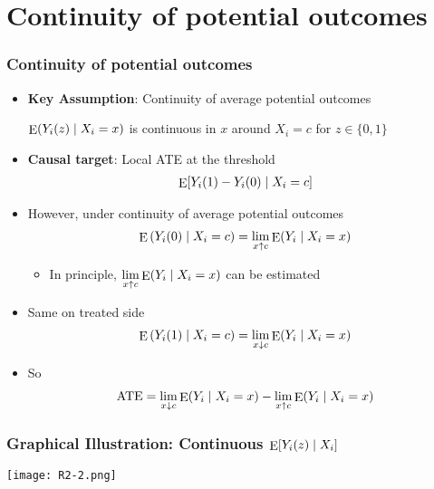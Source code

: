 \documentclass[table, xcolor = {dvipsnames}, 9pt]{beamer}
\theoremstyle{plain}
\DeclareMathOperator{\E}{\rm{E}}
\begin{document}
\section{Continuity of potential outcomes}
\begin{frame}
\frametitle{Continuity of potential outcomes} 
\begin{itemize} \vfill
\item {\bf Key Assumption}: \alert{Continuity of average potential outcomes} \vfill
\begin{center} \vfill
$\E(Y_i(z)\mid X_i=x)$ is continuous in $x$ around $X_i = c$
for $z \in \{0, 1\}$
\end{center} \vfill
\item {\bf Causal target}: Local ATE at the threshold \vfill
\begin{align*}
\E[Y_i(1) - Y_i(0) \mid X_i = c]
\end{align*} \vfill
\item However, under continuity of average potential outcomes \vfill
\begin{align*}
\E\left(Y_i(0) \mid X_i = c\right) = \lim_{x\uparrow c}\E(Y_i \mid X_i = x)
\end{align*} \vfill
\begin{itemize} \vfill
\item In principle, $\lim \limits_{x\uparrow c}\E(Y_i \mid X_i = x)$ can be estimated \vfill
\end{itemize} \vfill
\item Same on treated side
\begin{align*}
\E\left(Y_i(1) \mid X_i = c\right) = \lim_{x\downarrow c}\E(Y_i \mid X_i = x)
\end{align*} \vfill
\item So \vfill
\begin{align*}
\textrm{ATE} = \lim_{x\downarrow c}\E(Y_i \mid X_i = x) - \lim \limits_{x\uparrow c}\E(Y_i \mid X_i = x)
\end{align*} \vfill
\end{itemize} \vfill
\end{frame}
\begin{frame}
\frametitle{Graphical Illustration: Continuous $\E[Y_i(z)\mid X_i]$}
\begin{center}
\texttt{[image: R2-2.png]}
\end{center}
\end{frame}
\end{document}
